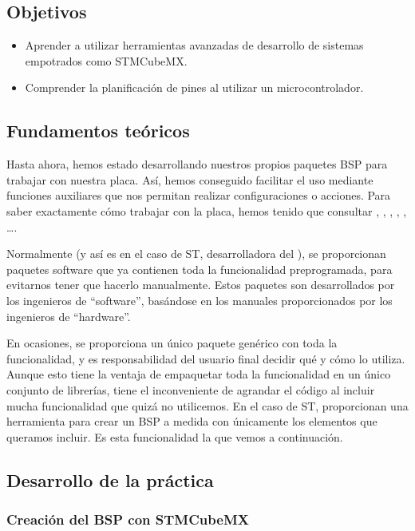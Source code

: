 \documentclass[../main.tex]{subfiles}
\begin{document}

    \subsection{Objetivos}
        \begin{itemize}
            \item Aprender a utilizar herramientas avanzadas de desarrollo de sistemas empotrados como STMCubeMX.
            \item Comprender la planificación de pines al utilizar un microcontrolador.
        \end{itemize}

    \subsection{Fundamentos teóricos}
       
        Hasta ahora, hemos estado desarrollando nuestros propios paquetes BSP para trabajar con nuestra placa. Así, hemos conseguido facilitar el uso mediante funciones auxiliares que nos permitan realizar configuraciones o acciones. Para saber exactamente cómo trabajar con la placa, hemos tenido que consultar \REFMAN, \BRDMAN, \DSMAN, \PMMAN, \ANMAN, \dots.

        Normalmente (y así es en el caso de ST, desarrolladora del \MCU), se proporcionan paquetes software que ya contienen toda la funcionalidad preprogramada, para evitarnos tener que hacerlo manualmente. Estos paquetes son desarrollados por los ingenieros de ``software'', basándose en los manuales proporcionados por los ingenieros de ``hardware''.

        En ocasiones, se proporciona un único paquete genérico con toda la funcionalidad, y es responsabilidad del usuario final decidir qué y cómo lo utiliza. Aunque esto tiene la ventaja de empaquetar toda la funcionalidad en un único conjunto de librerías, tiene el inconveniente de agrandar el código al incluir mucha funcionalidad que quizá no utilicemos. En el caso de ST, proporcionan una herramienta para crear un BSP a medida con únicamente los elementos que queramos incluir. Es esta funcionalidad la que vemos a continuación.

    \subsection{Desarrollo de la práctica}

        \subsubsection{Creación del BSP con STMCubeMX}
\end{document}
